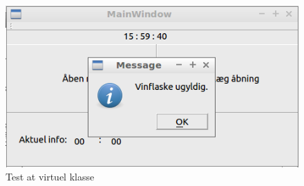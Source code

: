 \begin{figure}[H]
	\includegraphics[scale=1]{tex/Test/GUI-Test/Billeder/Test_Virtuel_klasse_invalid}
	\caption{Test at virtuel klasse}
	\label{PAA}
\end{figure}